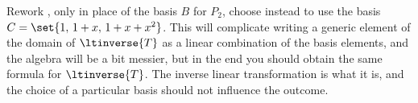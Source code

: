 Rework , only in place of the basis $B$ for $P_2$, choose instead to use the basis $C=\set{1,\,1+x,\,1+x+x^2}$.  This will complicate writing a generic element of the domain of $\ltinverse{T}$ as a linear combination of the basis elements, and the algebra will be a bit messier, but in the end you should obtain the same formula for $\ltinverse{T}$.  The inverse linear transformation is what it is, and the choice of a particular basis should not influence the outcome.